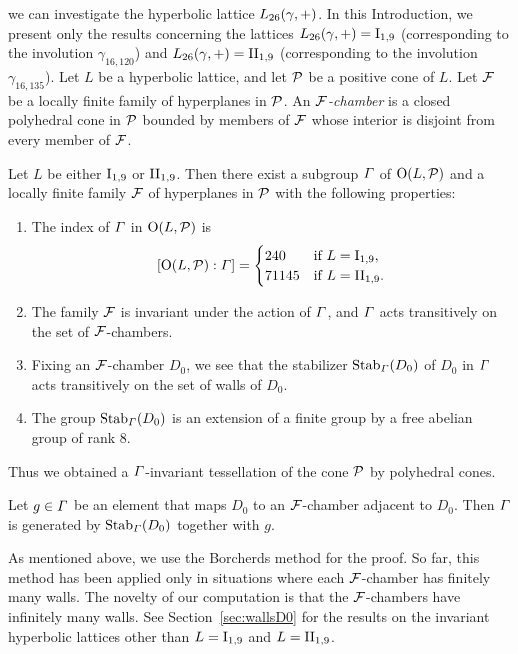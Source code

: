 \documentclass{amsart} %
\begin{document}
we can investigate %
the hyperbolic lattice $L_{26}(\gamma, +)$.
In this Introduction, 
we present only the results concerning
 the lattices $L_{26}(\gamma, +)=\mathrm{I}_{1,9}$ (corresponding to the involution $\gamma_{16,120}$) 
and $L_{26}(\gamma, +)=\mathrm{II}_{1,9}$ (corresponding to the involution $\gamma_{16,135}$).
Let $L$ be a hyperbolic lattice, 
and let $\mathord{\mathcal{P}}$ be a positive cone of $L$.
 Let $\mathord{\mathcal{F}}$ be a locally finite family of hyperplanes in $\mathord{\mathcal{P}}$. 
 An \emph{$\mathord{\mathcal{F}}$-chamber} is a closed polyhedral cone in $\mathord{\mathcal{P}}$ 
 bounded by members of $\mathord{\mathcal{F}}$ whose interior is disjoint from every member of $\mathord{\mathcal{F}}$.
%
%
\begin{theorem}\label{thm:main3}
Let $L$ be either $\mathrm{I}_{1,9}$ or $\mathrm{II}_{1,9}$. 
Then there exist a subgroup $\varGamma$ 
of $\mathord{\mathrm{O}}(L,\mathord{\mathcal{P}})$ and a locally finite family $\mathord{\mathcal{F}}$ of hyperplanes in $\mathord{\mathcal{P}}$
with the following properties:
\begin{enumerate}[label={\rm(\roman*)}]
%
\item
The index of $\varGamma$ in $\mathord{\mathrm{O}}(L,\mathord{\mathcal{P}})$ is 
\[
[\mathord{\mathrm{O}}(L,\mathord{\mathcal{P}}): \varGamma]=\begin{cases}
240 & \textrm{if $L=\mathrm{I}_{1,9}$}, \\
71145 & \textrm{if $L=\mathrm{II}_{1,9}$}. \\
\end{cases}
\]
\item The family $\mathord{\mathcal{F}}$ is invariant under the action of $\varGamma$, 
and $\varGamma$ acts transitively on the set of $\mathord{\mathcal{F}}$-chambers.
\item Fixing an $\mathord{\mathcal{F}}$-chamber $D_0$,
we see that the stabilizer $\operatorname{Stab}_{\varGamma}(D_0)$ of $D_0$ in $\varGamma$
 acts transitively on the set of walls of $D_0$.
 \item 
 The group 
 $\operatorname{Stab}_{\varGamma}(D_0)$ is an extension of a finite group by a free abelian group of rank $8$.
\end{enumerate}
\end{theorem}
%
Thus we obtained a $\varGamma$-invariant tessellation of the cone $\mathord{\mathcal{P}}$ by polyhedral cones.
%
\begin{corollary}\label{thm:CorOfmain3}
Let $g\in\varGamma$ be an element that maps $D_0$ to an $\mathord{\mathcal{F}}$-chamber adjacent to $D_0$. 
Then $\varGamma$ is generated by $\operatorname{Stab}_{\varGamma}(D_0)$ together with $g$.
\end{corollary}
%
As mentioned above, we use the Borcherds method for the proof. 
So far, 
 this method has been applied only in situations where each $\mathord{\mathcal{F}}$-chamber has finitely many walls. 
 The novelty of our computation is that 
 the $\mathord{\mathcal{F}}$-chambers have infinitely many walls. 
See Section~\ref{sec:wallsD0} for the results on the invariant hyperbolic lattices
other than $L=\mathrm{I}_{1,9}$ and $L=\mathrm{II}_{1,9}$.
%
\end{document}
